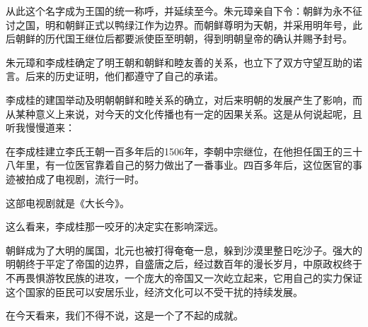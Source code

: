 \begin{multicols}{\theparacolNo}
		从此这个名字成为王国的统一称呼，并延续至今。朱元璋亲自下令：朝鲜为永不征讨之国，明和朝鲜正式以鸭绿江作为边界。而朝鲜尊明为天朝，并采用明年号，此后朝鲜的历代国王继位后都要派使臣至明朝，得到明朝皇帝的确认并赐予封号。

		朱元璋和李成桂确定了明王朝和朝鲜和睦友善的关系，也立下了双方守望互助的诺言。后来的历史证明，他们都遵守了自己的承诺。

		李成桂的建国举动及明朝朝鲜和睦关系的确立，对后来明朝的发展产生了影响，而从某种意义上来说，对今天的文化传播也有一定的因果关系。这是从何说起呢，且听我慢慢道来：

		在李成桂建立李氏王朝一百多年后的1506年，李朝中宗继位，在他担任国王的三十八年里，有一位医官靠着自己的努力做出了一番事业。四百多年后，这位医官的事迹被拍成了电视剧，流行一时。

		这部电视剧就是《大长今》。

		这么看来，李成桂那一咬牙的决定实在影响深远。

		朝鲜成为了大明的属国，北元也被打得奄奄一息，躲到沙漠里整日吃沙子。强大的明朝终于平定了帝国的边界，自盛唐之后，经过数百年的漫长岁月，中原政权终于不再畏惧游牧民族的进攻，一个庞大的帝国又一次屹立起来，它用自己的实力保证这个国家的臣民可以安居乐业，经济文化可以不受干扰的持续发展。

		在今天看来，我们不得不说，这是一个了不起的成就。
		\ifnum{}
	\end{multicols}
\fi
\newpage
